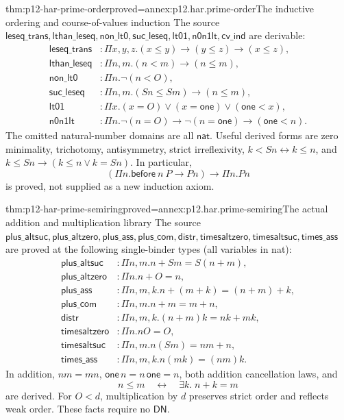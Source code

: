 \begin{hblemma}{thm:p12-har-prime-order}{proved=annex:p12.har.prime-order}{The inductive ordering and course-of-values induction}
The source \(\mathsf{leseq\_trans},\mathsf{lthan\_leseq},
\mathsf{non\_lt0},\mathsf{suc\_leseq},\mathsf{lt01},
\mathsf{n0n1lt},\mathsf{cv\_ind}\) are derivable:
\[
\begin{aligned}
 \mathsf{leseq\_trans}&:\Pi x,y,z.(x\le y)\to(y\le z)\to(x\le z),\\
 \mathsf{lthan\_leseq}&:\Pi n,m.(n<m)\to(n\le m),\\
 \mathsf{non\_lt0}&:\Pi n.\neg(n<O),\\
 \mathsf{suc\_leseq}&:\Pi n,m.(S n\le S m)\to(n\le m),\\
 \mathsf{lt01}&:\Pi x.(x=O)\vee(x=\mathsf{one})\vee(\mathsf{one}<x),\\
 \mathsf{n0n1lt}&:\Pi n.\neg(n=O)\to\neg(n=\mathsf{one})\to(\mathsf{one}<n).
\end{aligned}
\]
The omitted natural-number domains are all \(\mathsf{nat}\). Useful derived
forms are zero minimality, trichotomy, antisymmetry, strict
irreflexivity, \(k<S n\leftrightarrow k\le n\), and
\(k\le S n\to(k\le n\vee k=S n)\). In particular,
\[
 (\Pi n.\mathsf{before}\ n\ P\to P n)\to\Pi n.P n
\]
is proved, not supplied as a new induction axiom.
\end{hblemma}

\begin{hblemma}{thm:p12-har-prime-semiring}{proved=annex:p12.har.prime-semiring}{The actual addition and multiplication library}
The source \(\mathsf{plus\_altsuc},\mathsf{plus\_altzero},
\mathsf{plus\_ass},\mathsf{plus\_com},\mathsf{distr},
\mathsf{timesaltzero},\mathsf{timesaltsuc},\mathsf{times\_ass}\)
are proved at the following single-binder types (all variables in nat):
\[
\begin{aligned}
 \mathsf{plus\_altsuc}&:\Pi n,m.n+S m=S(n+m),\\
 \mathsf{plus\_altzero}&:\Pi n.n+O=n,\\
 \mathsf{plus\_ass}&:\Pi n,m,k.n+(m+k)=(n+m)+k,\\
 \mathsf{plus\_com}&:\Pi n,m.n+m=m+n,\\
 \mathsf{distr}&:\Pi n,m,k.(n+m)k=nk+mk,\\
 \mathsf{timesaltzero}&:\Pi n.nO=O,\\
 \mathsf{timesaltsuc}&:\Pi n,m.n(S m)=nm+n,\\
 \mathsf{times\_ass}&:\Pi n,m,k.n(mk)=(nm)k.
\end{aligned}
\]
In addition,
\(nm=mn\), \(\mathsf{one}\,n=n\,\mathsf{one}=n\), both addition
cancellation laws, and
\[
 n\le m\quad\leftrightarrow\quad\exists k.\;n+k=m
\]
are derived. For \(O<d\), multiplication by \(d\) preserves strict
order and reflects weak order. These facts require no \(\mathsf{DN}\).
\end{hblemma}

